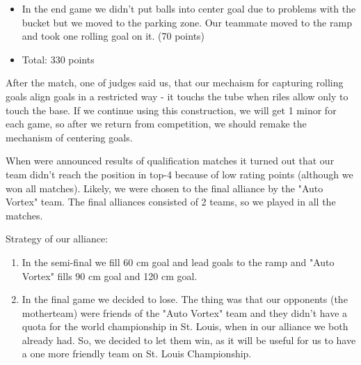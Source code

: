 \begin{enumerate}
\begin{itemize}
		\item In the end game we didn't put balls into center goal due to problems with the bucket but we moved to the parking zone. Our teammate moved to the ramp and took one rolling goal on it. (70 points)
		
		\item Total: 330 points
	\end{itemize}
	After the match, one of judges said us, that our mechaism for capturing rolling goals align goals in a restricted way - it touchs the tube when riles allow only to touch the base. If we continue using this construction, we will get 1 minor for each game, so after we return from competition, we should remake the mechanism of centering goals.
\end{enumerate}


When were announced results of qualification matches it turned out that our team didn't reach the position in top-4 because of low rating points (although we won all matches). Likely, we were chosen to the final alliance by the "Auto Vortex" team. The final alliances consisted of 2 teams, so we played in all the matches.\newline

Strategy of our alliance:
\begin{enumerate}
	\item In the semi-final we fill 60 cm goal and lead goals to the ramp and "Auto Vortex" fills 90 cm goal and 120 cm goal.
	
	\item In the final game we decided to lose. The thing was that our opponents (the motherteam) were friends of the "Auto Vortex" team and they didn't have a quota for the world championship in St. Louis, when in our alliance we both already had. So, we decided to let them win, as it will be useful for us to have a one more friendly team on St. Louis Championship.
\end{enumerate}


